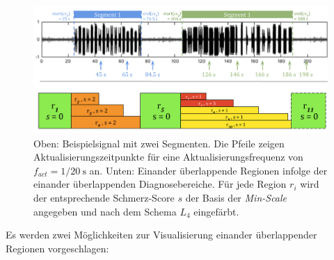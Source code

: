 \begin{figure}[h]
	\centering
	\includegraphics[width=1\textwidth]{bilder/viz-multiple-regions.png}
	\caption[Ein Beispielsignal mit zeitlich einander überlappenden Diagnosebereichen]{Oben: Beispielsignal mit zwei Segmenten. Die Pfeile zeigen Aktualisierungszeitpunkte für eine Aktualisierungsfrequenz von $f_{act} = 1/ \SI{20}{\second}$ an. Unten: Einander überlappende Regionen infolge der einander überlappenden Diagnosebereiche. Für jede Region $r_i$ wird der entsprechende Schmerz-Score $s$ der Basis der \emph{Min-Scale} angegeben und nach dem Schema $L_4$ eingefärbt.}
	\label{fig:viz_multiple_regions}
\end{figure}

Es werden zwei Möglichkeiten zur Visualisierung einander überlappender Regionen vorgeschlagen:


